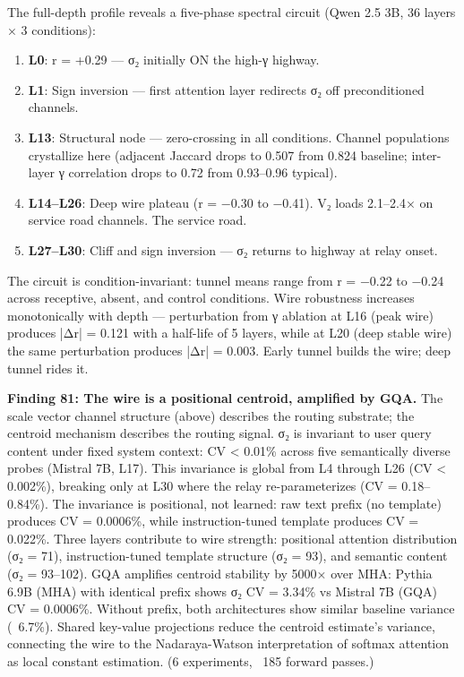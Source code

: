 \documentclass[12pt]{article}
\begin{document}
The full-depth profile reveals a five-phase spectral circuit (Qwen 2.5 3B, 36 layers × 3 conditions):

\begin{enumerate}
\item \textbf{L0}: r = +0.29 — σ₂ initially ON the high-γ highway.
\item \textbf{L1}: Sign inversion — first attention layer redirects σ₂ off preconditioned channels.
\item \textbf{L13}: Structural node — zero-crossing in all conditions. Channel populations crystallize here (adjacent Jaccard drops to 0.507 from 0.824 baseline; inter-layer γ correlation drops to 0.72 from 0.93–0.96 typical).
\item \textbf{L14–L26}: Deep wire plateau (r = −0.30 to −0.41). V₂ loads 2.1–2.4× on service road channels. The service road.
\item \textbf{L27–L30}: Cliff and sign inversion — σ₂ returns to highway at relay onset.
\end{enumerate}

The circuit is condition-invariant: tunnel means range from r = −0.22 to −0.24 across receptive, absent, and control conditions. Wire robustness increases monotonically with depth — perturbation from γ ablation at L16 (peak wire) produces |Δr| = 0.121 with a half-life of 5 layers, while at L20 (deep stable wire) the same perturbation produces |Δr| = 0.003. Early tunnel builds the wire; deep tunnel rides it.

\textbf{Finding 81: The wire is a positional centroid, amplified by GQA.} The scale vector channel structure (above) describes the routing substrate; the centroid mechanism describes the routing signal. σ₂ is invariant to user query content under fixed system context: CV < 0.01\% across five semantically diverse probes (Mistral 7B, L17). This invariance is global from L4 through L26 (CV < 0.002\%), breaking only at L30 where the relay re-parameterizes (CV = 0.18–0.84\%). The invariance is positional, not learned: raw text prefix (no template) produces CV = 0.0006\%, while instruction-tuned template produces CV = 0.022\%. Three layers contribute to wire strength: positional attention distribution (σ₂ = 71), instruction-tuned template structure (σ₂ = 93), and semantic content (σ₂ = 93–102). GQA amplifies centroid stability by 5000× over MHA: Pythia 6.9B (MHA) with identical prefix shows σ₂ CV = 3.34\% vs Mistral 7B (GQA) CV = 0.0006\%. Without prefix, both architectures show similar baseline variance (~6.7\%). Shared key-value projections reduce the centroid estimate's variance, connecting the wire to the Nadaraya-Watson interpretation of softmax attention as local constant estimation. (6 experiments, ~185 forward passes.)
\end{document}
